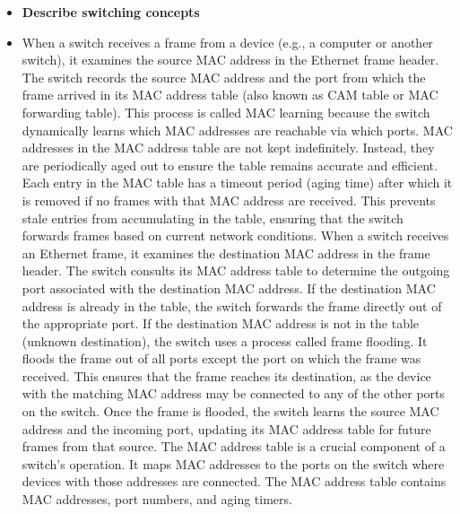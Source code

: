 \documentclass{article}
\begin{document}
\begin{itemize}
\item \textbf{Describe switching concepts}
	\item[] When a switch receives a frame from a device (e.g., a computer or another switch), it examines the source MAC address in the Ethernet frame header. The switch records the source MAC address and the port from which the frame arrived in its MAC address table (also known as CAM table or MAC forwarding table). This process is called MAC learning because the switch dynamically learns which MAC addresses are reachable via which ports. MAC addresses in the MAC address table are not kept indefinitely. Instead, they are periodically aged out to ensure the table remains accurate and efficient. Each entry in the MAC table has a timeout period (aging time) after which it is removed if no frames with that MAC address are received. This prevents stale entries from accumulating in the table, ensuring that the switch forwards frames based on current network conditions. When a switch receives an Ethernet frame, it examines the destination MAC address in the frame header. The switch consults its MAC address table to determine the outgoing port associated with the destination MAC address. If the destination MAC address is already in the table, the switch forwards the frame directly out of the appropriate port. If the destination MAC address is not in the table (unknown destination), the switch uses a process called frame flooding. It floods the frame out of all ports except the port on which the frame was received. This ensures that the frame reaches its destination, as the device with the matching MAC address may be connected to any of the other ports on the switch. Once the frame is flooded, the switch learns the source MAC address and the incoming port, updating its MAC address table for future frames from that source. The MAC address table is a crucial component of a switch's operation. It maps MAC addresses to the ports on the switch where devices with those addresses are connected. The MAC address table contains MAC addresses, port numbers, and aging timers.
\end{itemize}
\end{document}
